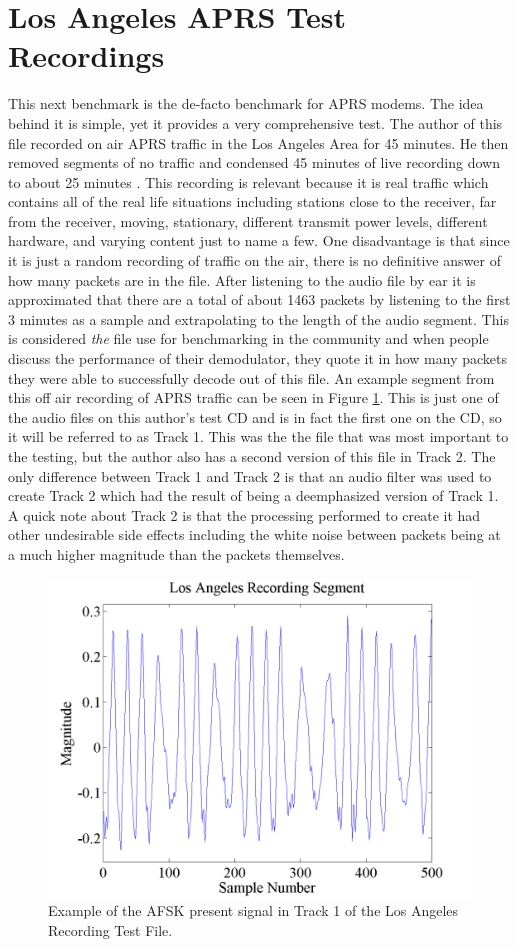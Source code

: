 \section{Los Angeles APRS Test Recordings}
This next benchmark is the de-facto benchmark for APRS modems. The idea behind it is simple, yet it provides a very comprehensive test. The author of this file recorded on air APRS traffic in the Los Angeles Area for 45 minutes. He then removed segments of no traffic and condensed 45 minutes of live recording down to about 25 minutes \cite{Smith2009}. This recording is relevant because it is real traffic which contains all of the real life situations including stations close to the receiver, far from the receiver, moving, stationary, different transmit power levels, different hardware, and varying content just to name a few. One disadvantage is that since it is just a random recording of traffic on the air, there is no definitive answer of how many packets are in the file. After listening to the audio file by ear it is approximated that there are a total of about 1463 packets by listening to the first 3 minutes as a sample and extrapolating to the length of the audio segment. This is considered \textit{the} file use for benchmarking in the community and when people discuss the performance of their demodulator, they quote it in how many packets they were able to successfully decode out of this file. An example segment from this off air recording of APRS traffic can be seen in Figure \ref{Track1Segment}. This is just one of the audio files on this author's test CD and is in fact the first one on the CD, so it will be referred to as Track 1. This was the the file that was most important to the testing, but the author also has a second version of this file in Track 2. The only difference between Track 1 and Track 2 is that an audio filter was used to create Track 2 which had the result of being a deemphasized version of Track 1. A quick note about Track 2 is that the processing performed to create it had other undesirable side effects including the white noise between packets being at a much higher magnitude than the packets themselves.
\begin{figure}
  \centering
	\includegraphics[width=0.75\linewidth]{images/LosAngelesRecordingSegment.png} 
	\caption{Example of the AFSK present signal in Track 1 of the Los Angeles Recording Test File.}
   \label{Track1Segment}
\end{figure}
